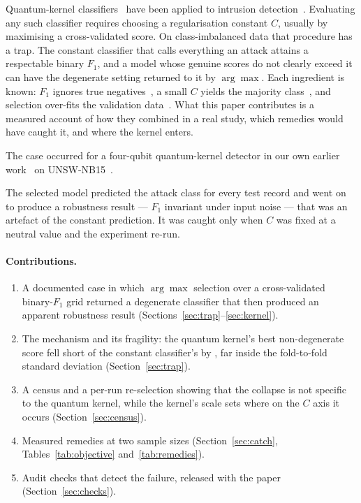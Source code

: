 \documentclass[runningheads]{llncs}
\newcommand{\Fone}{F_1}
\begin{document}
Quantum-kernel classifiers~\cite{havlicek2019,schuld2019hilbert} have been
applied to intrusion
detection~\cite{payares2021dos,kalinin2023qids,abreu2025quantumnetsec,kaissar2026survey}.
Evaluating any such classifier requires choosing a regularisation constant
$C$, usually by maximising a cross-validated score. On class-imbalanced data
that procedure has a trap. The constant classifier that calls everything an
attack attains a respectable binary $\Fone$, and a model whose genuine scores
do not clearly exceed it can have the degenerate setting returned to it by
$\arg\max$. Each ingredient is known: $\Fone$ ignores true
negatives~\cite{chicco2020mcc}, a small $C$ yields the majority
class~\cite{cortes1995svm}, and selection over-fits the validation
data~\cite{cawley2010overfitting}. What this paper contributes is a measured
account of how they combined in a real study, which remedies would have caught
it, and where the kernel enters.

The case occurred for a four-qubit quantum-kernel detector in our own earlier
work~\cite{companion} on UNSW-NB15~\cite{moustafa2015unsw}.

The selected model predicted the attack class for every test record and went
on to produce a robustness result --- $\Fone$ invariant under input noise ---
that was an artefact of the constant prediction. It was caught only when $C$
was fixed at a neutral value and the experiment re-run.

\paragraph{Contributions.}
\begin{enumerate}
  \item A documented case in which $\arg\max$ selection over a
        cross-validated binary-$\Fone$ grid returned a degenerate classifier
        that then produced an apparent robustness result
        (Sections~\ref{sec:trap}--\ref{sec:kernel}).
  \item The mechanism and its fragility: the quantum kernel's best
        non-degenerate score fell short of the constant classifier's by
        \pfloorGap, far inside the fold-to-fold standard deviation
        (Section~\ref{sec:trap}).
  \item A census and a per-run re-selection showing that the collapse is not
        specific to the quantum kernel, while the kernel's scale sets where on
        the $C$ axis it occurs (Section~\ref{sec:census}).
  \item Measured remedies at two sample sizes (Section~\ref{sec:catch},
        Tables~\ref{tab:objective} and~\ref{tab:remedies}).
  \item Audit checks that detect the failure, released with the paper
        (Section~\ref{sec:checks}).
\end{enumerate}
\end{document}
